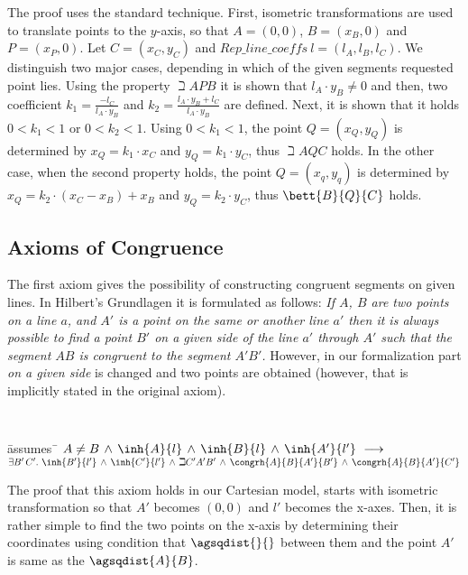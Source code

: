 The proof uses the standard technique. First, isometric
transformations are used to translate points to the $y$-axis, so that
$A = (0, 0)$, $B = (x_B, 0)$ and $P = (x_P, 0)$. Let $C = (x_C, y_C)$
and $\mathit{Rep\_line\_coeffs}\ l = (l_A, l_B, l_C)$. We distinguish two
major cases, depending in which of the given segments requested point
lies. Using the property $\beth{A}{P}{B}$ it is shown that $l_A\cdot
y_B \neq 0$ and then, two coefficient $k_1 = \frac{-l_C}{l_A\cdot
  y_B}$ and $k_2 = \frac{l_A\cdot y_B + l_C}{l_A\cdot y_B}$ are
defined. Next, it is shown that it holds $0 < k_1 < 1$ or $0 < k_2 <
1$. Using $0 < k_1 < 1$, the point $Q = (x_Q, y_Q)$ is determined by
$x_Q = k_1\cdot x_C$ and $y_Q = k_1\cdot y_C$, thus $\beth{A}{Q}{C}$
holds. In the other case, when the second property holds, the point
$Q=(x_q, y_q)$ is determined by $x_Q = k_2\cdot (x_C - x_B) + x_B$ and
$y_Q = k_2\cdot y_C$, thus $\bett{B}{Q}{C}$ holds.

\subsection{Axioms of Congruence}
The first axiom gives the possibility of constructing congruent
segments on given lines. In Hilbert's Grundlagen \cite{hilbert} it is
formulated as follows: \emph{If $A$, $B$ are two points on a line $a$, and
  $A'$ is a point on the same or another line $a'$ then it is always
  possible to find a point $B'$ on a given side of the line $a'$ through
  $A'$ such that the segment $AB$ is congruent to the segment $A'B'$.}
However, in our formalization part \emph{on a given side} is changed
and two points are obtained (however, that is implicitly stated in the
original axiom).

{\tt
\begin{tabbing}
\hspace{5mm}\=assumes\ \=\kill
$A \neq B\,\wedge\,\inh{A}{l}\,\wedge\,\inh{B}{l}\,\wedge\,\inh{A'}{l'}\ \longrightarrow$\\
\> $\exists B'\, C'.\ \inh{B'}{l'}\,\wedge\,\inh{C'}{l'}\,\wedge\,\beth{C'}{A'}{B'}\,\wedge\,\congrh{A}{B}{A'}{B'}\,\wedge\,\congrh{A}{B}{A'}{C'}$
\end{tabbing}
}

The proof that this axiom holds in our Cartesian model, starts with
isometric transformation so that $A'$ becomes $(0, 0)$ and $l'$
becomes the x-axes. Then, it is rather simple to find the two points
on the x-axis by determining their coordinates using condition that
$\agsqdist{}{}$ between them and the point $A'$ is same as the
$\agsqdist{A}{B}$.


